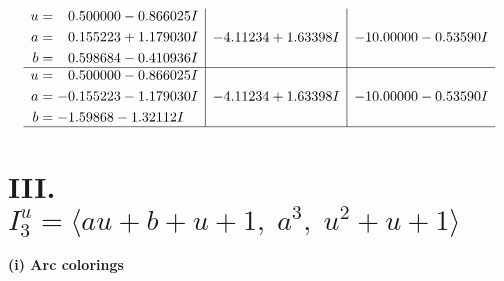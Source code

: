 \documentclass[1p]{elsarticle_modified}
\theoremstyle{definition}
\begin{document}
$$\begin{array}{c|c|c}
\begin{aligned}
u &= \phantom{-}0.500000 - 0.866025 I \\
a &= \phantom{-}0.155223 + 1.179030 I \\
b &= \phantom{-}0.598684 - 0.410936 I\end{aligned}
 & -4.11234 + 1.63398 I & -10.00000 - 0.53590 I \\ \hline\begin{aligned}
u &= \phantom{-}0.500000 - 0.866025 I \\
a &= -0.155223 - 1.179030 I \\
b &= -1.59868 - 1.32112 I\end{aligned}
 & -4.11234 + 1.63398 I & -10.00000 - 0.53590 I\\
 \hline 
 \end{array}$$\newpage\newpage\renewcommand{\arraystretch}{1}
\centering \section*{III. $I^u_{3}= \langle a u+b+u+1,\;a^3,\;u^2+u+1 \rangle$}
\flushleft \textbf{(i) Arc colorings}\\
\end{document}
